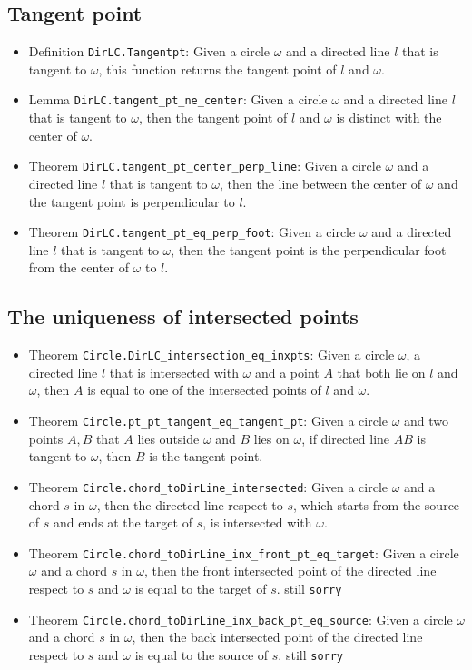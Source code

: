 \documentclass[12pt]{amsart}
\begin{document}
\subsection{Tangent point}
\begin{itemize}
    \item Definition \verb|DirLC.Tangentpt|: Given a circle $\omega$ and a directed line $l$ that is tangent to $\omega$, this function returns the tangent point of $l$ and $\omega$.
    \item Lemma \verb|DirLC.tangent_pt_ne_center|: Given a circle $\omega$ and a directed line $l$ that is tangent to $\omega$, then the tangent point of $l$ and $\omega$ is distinct with the center of $\omega$.
    \item Theorem \verb|DirLC.tangent_pt_center_perp_line|: Given a circle $\omega$ and a directed line $l$ that is tangent to $\omega$, then the line between the center of $\omega$ and the tangent point is perpendicular to $l$.
    \item Theorem \verb|DirLC.tangent_pt_eq_perp_foot|: Given a circle $\omega$ and a directed line $l$ that is tangent to $\omega$, then the tangent point is the perpendicular foot from the center of $\omega$ to $l$.
\end{itemize}

\subsection{The uniqueness of intersected points}
\begin{itemize}
    \item Theorem \verb|Circle.DirLC_intersection_eq_inxpts|: Given a circle $\omega$, a directed line $l$ that is intersected with $\omega$ and a point $A$ that both lie on $l$ and $\omega$, then $A$ is equal to one of the intersected points of $l$ and $\omega$.
    \item Theorem \verb|Circle.pt_pt_tangent_eq_tangent_pt|: Given a circle $\omega$ and two points $A,B$ that $A$ lies outside $\omega$ and $B$ lies on $\omega$, if directed line $AB$ is tangent to $\omega$, then $B$ is the tangent point.
    \item Theorem \verb|Circle.chord_toDirLine_intersected|: Given a circle $\omega$ and a chord $s$ in $\omega$, then the directed line respect to $s$, which starts from the source of $s$ and ends at the target of $s$, is intersected with $\omega$.
    \item Theorem \verb|Circle.chord_toDirLine_inx_front_pt_eq_target|: Given a circle $\omega$ and a chord $s$ in $\omega$, then the front intersected point of the directed line respect to $s$ and $\omega$ is equal to the target of $s$. {\color{red} still \verb|sorry|}
    \item Theorem \verb|Circle.chord_toDirLine_inx_back_pt_eq_source|: Given a circle $\omega$ and a chord $s$ in $\omega$, then the back intersected point of the directed line respect to $s$ and $\omega$ is equal to the source of $s$. {\color{red} still \verb|sorry|}
\end{itemize}
\end{document}
